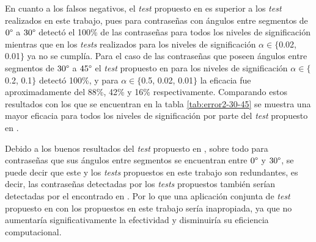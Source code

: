 \documentclass[12pt]{report}
\begin{document}
En cuanto a los falsos negativos, el \textit{test} propuesto en \cite{13} es superior a los \textit{test} realizados en este trabajo, pues para contraseñas con ángulos entre segmentos de  $0\degree$ a $30\degree$ detectó el 100\% de las contraseñas para todos los niveles de significación mientras que en los \textit{tests} realizados para los niveles de significación  $\alpha \in \{$0.02, 0.01$\}$ ya no se cumplía. Para el caso de las contraseñas que poseen ángulos entre segmentos de $30\degree$ a $45\degree$ el \textit{test} propuesto en \cite{13} para los niveles de significación $\alpha \in \{$0.2, 0.1$\}$ detectó 100\%, y para $\alpha \in \{$0.5, 0.02, 0.01$\}$ la eficacia fue aproximadamente  del 88\%, 42\% y 16\% respectivamente. Comparando estos resultados con los que se encuentran en la tabla \ref{tab:error2-30-45} se muestra una mayor eficacia para todos los niveles de significación por parte del \textit{test} propuesto en \cite{13}.

Debido a los buenos resultados del \textit{test} propuesto en \cite{13}, sobre todo para contraseñas que sus ángulos entre segmentos se encuentran entre $0\degree$ y $30\degree$, se puede decir que este y los \textit{tests} propuestos en este trabajo son redundantes, es decir, las contraseñas detectadas por los\textit{ tests} propuestos también serían detectadas por el encontrado en \cite{13}. Por lo que una aplicación conjunta de \textit{test} propuesto en \cite{13} con los propuestos en este trabajo sería inapropiada, ya que no aumentaría significativamente la efectividad y disminuiría su eficiencia computacional.

\end{document}
